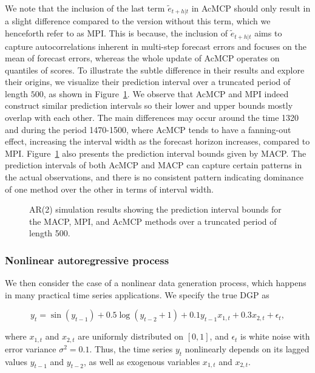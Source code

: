 \documentclass[
  11pt,
  a4paper,
]{article}
\theoremstyle{plain}
\theoremstyle{remark}
\begin{document}
We note that the inclusion of the last term \(\tilde{e}_{t+h|t}\) in
AcMCP should only result in a slight difference compared to the version
without this term, which we henceforth refer to as MPI. This is because,
the inclusion of \(\tilde{e}_{t+h|t}\) aims to capture autocorrelations
inherent in multi-step forecast errors and focuses on the mean of
forecast errors, whereas the whole update of AcMCP operates on quantiles
of scores. To illustrate the subtle difference in their results and
explore their origins, we visualize their prediction interval over a
truncated period of length \(500\), as shown in
Figure~\ref{fig-AR2_timeplot}. We observe that AcMCP and MPI indeed
construct similar prediction intervals so their lower and upper bounds
mostly overlap with each other. The main differences may occur around
the time 1320 and during the period 1470-1500, where AcMCP tends to have
a fanning-out effect, increasing the interval width as the forecast
horizon increases, compared to MPI. Figure~\ref{fig-AR2_timeplot} also
presents the prediction interval bounds given by MACP. The prediction
intervals of both AcMCP and MACP can capture certain patterns in the
actual observations, and there is no consistent pattern indicating
dominance of one method over the other in terms of interval width.

\begin{figure}


\caption{\label{fig-AR2_timeplot}AR(2) simulation results showing the
prediction interval bounds for the MACP, MPI, and AcMCP methods over a
truncated period of length 500.}

\end{figure}%

\subsubsection{Nonlinear autoregressive
process}\label{nonlinear-autoregressive-process}

We then consider the case of a nonlinear data generation process, which
happens in many practical time series applications. We specify the true
DGP as

\[
y_t = \sin(y_{t-1}) + 0.5\log(y_{t-2} + 1) + 0.1y_{t-1}x_{1,t} + 0.3x_{2,t} + \epsilon_{t},
\]

where \(x_{1,t}\) and \(x_{2,t}\) are uniformly distributed on
\([0,1]\), and \(\epsilon_{t}\) is white noise with error variance
\(\sigma^2 = 0.1\). Thus, the time series \(y_t\) nonlinearly depends on
its lagged values \(y_{t-1}\) and \(y_{t-2}\), as well as exogenous
variables \(x_{1,t}\) and \(x_{2,t}\).
\end{document}
